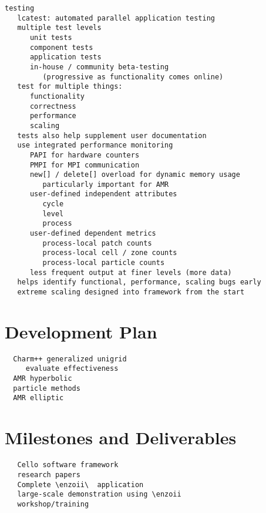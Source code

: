 \documentclass[10pt]{article}
\begin{document}
\begin{verbatim}
testing
   lcatest: automated parallel application testing
   multiple test levels
      unit tests
      component tests
      application tests
      in-house / community beta-testing
         (progressive as functionality comes online)
   test for multiple things:
      functionality
      correctness
      performance
      scaling
   tests also help supplement user documentation
   use integrated performance monitoring
      PAPI for hardware counters
      PMPI for MPI communication
      new[] / delete[] overload for dynamic memory usage
         particularly important for AMR
      user-defined independent attributes
         cycle
         level
         process
      user-defined dependent metrics
         process-local patch counts
         process-local cell / zone counts
         process-local particle counts
      less frequent output at finer levels (more data)
   helps identify functional, performance, scaling bugs early
   extreme scaling designed into framework from the start
\end{verbatim}

\section{Development Plan} \label{s:plan} 

\begin{verbatim}
  Charm++ generalized unigrid
     evaluate effectiveness
  AMR hyperbolic
  particle methods
  AMR elliptic
\end{verbatim}

\section{Milestones and Deliverables} \label{s:milestones}

\begin{verbatim}
   Cello software framework
   research papers
   Complete \enzoii\  application
   large-scale demonstration using \enzoii
   workshop/training
\end{verbatim}



\end{document}
